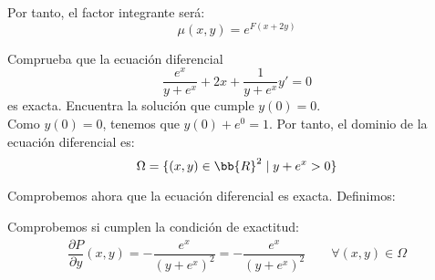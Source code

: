 \documentclass[12pt]{article}
\begin{document}
\begin{ejercicio}
        Por tanto, el factor integrante será:
        \begin{equation*}
            \mu(x, y) = e^{F(x + 2y)}
        \end{equation*}
    \end{ejercicio}

    \begin{ejercicio}
        Comprueba que la ecuación diferencial
        \begin{equation*}
            \dfrac{e^x}{y+e^x} +2x+\dfrac{1}{y + e^x}y' = 0
        \end{equation*}
        es exacta. Encuentra la solución que cumple $y(0) = 0$.\\

        Como $y(0)=0$, tenemos que $y(0)+e^0=1$. Por tanto, el dominio de la ecuación diferencial es:
        \begin{equation*}
            \Omega=\{(x,y)\in\bb{R}^2\mid y+e^x > 0\}
        \end{equation*}
        \begin{comment}
        Para ver que es conexo, veremos que es estrellado desde el origen. Sea $(x,y)\in\Omega$, entonces $y+e^x>0$. Tenemos que:
        \begin{multline*}
            [(0,0),(x,y)]=\{(1-t)(0,0)+t(x,y)\mid t\in[0,1]\}=\{(tx,ty)\mid t\in[0,1]\}\subset \Omega
            \Longleftrightarrow
            \\ \Longleftrightarrow
             ty+e^{tx}>0 \Longleftrightarrow t(y+e^x)>0 \qquad \forall t\in[0,1]
        \end{multline*}
        que es cierto por hipótesis. Por tanto, ese dominio es válido.
        \end{comment}
        Comprobemos ahora que la ecuación diferencial es exacta.
        Definimos:

        Comprobemos si cumplen la condición de exactitud:
        \begin{align*}
            \dfrac{\partial P}{\partial y}(x,y) = -\dfrac{e^x}{(y+e^x)^2} = -\dfrac{e^x}{(y+e^x)^2}\qquad \forall (x,y)\in\Omega\\
        \end{align*}


\end{ejercicio}
\end{document}
